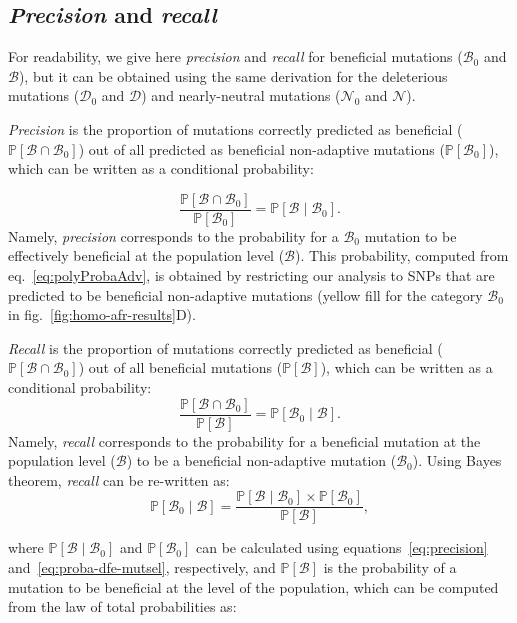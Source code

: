 \documentclass{article}
\newcommand{\proba}{\mathbb{P}}
\newcommand{\SphyDel}{\mathcal{D}_0}
\newcommand{\SphyNeu}{\mathcal{N}_0}
\newcommand{\SphyBen}{\mathcal{B}_0}
\newcommand{\given}{\mid}
\newcommand{\SpopDel}{\mathcal{D}}
\newcommand{\SpopNeu}{\mathcal{N}}
\newcommand{\SpopBen}{\mathcal{B}}
\newcommand{\ProbaPopBen}{\proba [ \SpopBen ]}
\begin{document}
    \subsection{\textit{Precision} and \textit{recall}}
    \label{subsec:precisison_recall}
    For readability, we give here \textit{precision} and \textit{recall} for beneficial mutations ($\SphyBen$ and $\SpopBen$), but it can be obtained using the same derivation for the deleterious mutations ($\SphyDel$ and $\SpopDel$) and nearly-neutral mutations ($\SphyNeu$ and $\SpopNeu$).

    \textit{Precision} is the proportion of mutations correctly predicted as beneficial ($\proba [ \SpopBen \cap  \SphyBen]$) out of all predicted as beneficial non-adaptive mutations ($\proba [ \SphyBen]$), which can be written as a conditional probability:

    \begin{equation}
        \frac{\proba [ \SpopBen  \cap  \SphyBen]}{\proba [ \SphyBen]} = \proba [ \SpopBen \given \SphyBen].
        \label{eq:precision}
    \end{equation}
    Namely, \textit{precision} corresponds to the probability for a $\SphyBen$ mutation to be effectively beneficial at the population level ($\SpopBen$).
    This probability, computed from eq.~\ref{eq:polyProbaAdv}, is obtained by restricting our analysis to SNPs that are predicted to be beneficial non-adaptive mutations (yellow fill for the category $\SphyBen$ in fig.~\ref{fig:homo-afr-results}D).

    \textit{Recall} is the proportion of mutations correctly predicted as beneficial ($\proba [ \SpopBen \cap  \SphyBen]$) out of all beneficial mutations ($\proba [ \SpopBen]$), which can be written as a conditional probability:
    \begin{equation}
        \frac{\proba [ \SpopBen \cap  \SphyBen]}{\proba [ \SpopBen]} = \proba [ \SphyBen  \given \SpopBen ].
    \end{equation}
    Namely, \textit{recall} corresponds to the probability for a beneficial mutation at the population level ($\SpopBen$) to be a beneficial non-adaptive mutation ($\SphyBen$).
    Using Bayes theorem, \textit{recall} can be re-written as:
    \begin{equation}
        \proba [\SphyBen \given \SpopBen] = \frac{\proba [\SpopBen \given \SphyBen] \times \proba[\SphyBen]}{\ProbaPopBen},
        \label{eq:bayes}
    \end{equation}

    where $\proba [\SpopBen \given \SphyBen]$ and $\proba [ \SphyBen ]$ can be calculated using equations~\ref{eq:precision} and~\ref{eq:proba-dfe-mutsel}, respectively, and $\proba [ \SpopBen ]$ is the probability of a mutation to be beneficial at the level of the population, which can be computed from the law of total probabilities as:
\end{document}
